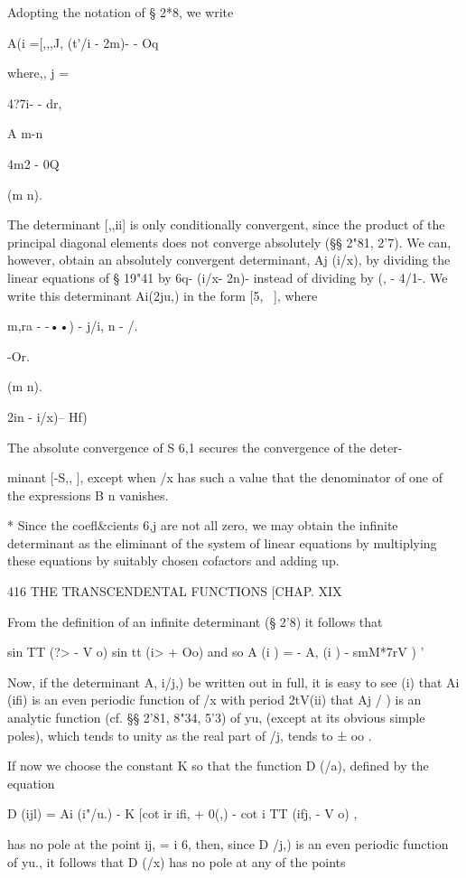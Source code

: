 Adopting the notation of § 2*8, we write

A(i =[,,,J, (t'/i - 2m)- - Oq

where,, j =

4?7i- - dr,

A m-n

4m2 - 0Q

(m n).

The determinant [,,ii] is only conditionally convergent, since the
product of the principal diagonal elements does not converge
absolutely (§§ 2"81, 2'7). We can, however, obtain an absolutely
convergent determinant, Aj (i/x), by dividing the linear equations of
§ 19"41 by 6q- (i/x- 2n)- instead of dividing by (, - 4/1-. We write
this determinant Ai(2ju,) in the form [5, \ ], where

  m,ra - -••) - j/i, n - /.

-Or.

(m n).

 2in - i/x)-- Hf)

The absolute convergence of S 6,1 secures the convergence of the
deter-

minant [-S,, ], except when /x has such a value that the denominator
of one of the expressions B n vanishes.

* Since the coefl\&cients 6,j are not all zero, we may obtain the
infinite determinant as the eliminant of the system of linear
equations by multiplying these equations by suitably chosen cofactors
and adding up.

416 THE TRANSCENDENTAL FUNCTIONS [CHAP. XIX

From the definition of an infinite determinant (§ 2'8) it follows that

sin TT (?> - V o) sin tt (i> + \/Oo) and so A (i ) = - A, (i ) -
smM*7rV ) '

Now, if the determinant A, i/j,) be written out in full, it is easy to
see (i) that Ai (ifi) is an even periodic function of /x with period
2tV(ii) that Aj / ) is an analytic function (cf. §§ 2'81, 8"34, 5'3)
of yu, (except at its obvious simple poles), which tends to unity as
the real part of /j, tends to ± oo .

If now we choose the constant K so that the function D (/a), defined
by the equation

D (ijl) = Ai (i"/u.) - K [cot ir ifi, + \/0(,) - cot i TT (ifj, - V o)
,

has no pole at the point ij, = i 6, then, since D /j,) is an even
periodic function of yu., it follows that D (/x) has no pole at any of
the points

